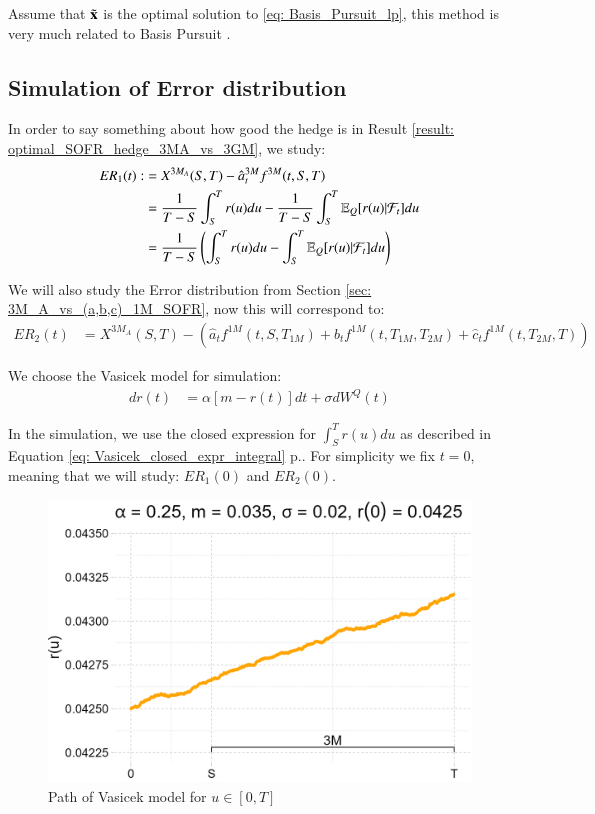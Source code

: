 Assume that $\Tilde{\mathbf{x}}$ is the optimal solution to \ref{eq: Basis_Pursuit_lp}, this method is
very much related to Basis Pursuit \cite{chen1998atomic}.



\newpage 

\subsection{Simulation of Error distribution}

In order to say something about how good the hedge is in Result \ref{result: optimal_SOFR_hedge_3MA_vs_3GM}, we study: 
\begin{align*}
ER_{1}(t) :&= X^{3M_{A}}(S,T) - \hat{a}_{t}^{3M}f^{3M}(t,S,T) \\ 
&= \frac{1}{T-S}\int_{S}^{T}r(u)du - \frac{1}{T-S}\int_{S}^{T}\mathbb{E}_{Q}[r(u)|\mathcal{F}_{t}]du \\ 
&= 
\frac{1}{T-S}\left(
\int_{S}^{T}r(u)du - \int_{S}^{T}\mathbb{E}_{Q}[r(u)|\mathcal{F}_{t}]du
\right)
\end{align*}

We will also study the Error distribution from Section \ref{sec: 3M_A_vs_(a,b,c)_1M_SOFR}, now this will correspond to: 
\begin{align*}
ER_{2}(t) &= 
X^{3M_{A}}(S,T) - \left(
\hat{a}_{t}f^{1M}(t,S,T_{1M}) + 
\hat{b}_{t}f^{1M}(t,T_{1M}, T_{2M}) + 
\hat{c}_{t}f^{1M}(t,T_{2M}, T)
\right)
\end{align*}


We choose the Vasicek model for simulation:
\begin{align*}
dr(t) &= \alpha[m-r(t)]dt + \sigma dW^{Q}(t)    
\end{align*}

In the simulation, we use the closed expression for $\int_{S}^{T}r(u)du$  as described in Equation \ref{eq: Vasicek_closed_expr_integral} p.\pageref{eq: Vasicek_closed_expr_integral}.
For simplicity we fix $t=0$, meaning that we will study: 
$ER_{1}(0)$ and $ER_{2}(0)$.

\begin{figure}[htp]
    \centering
    \includegraphics[width=12cm]{figures/SOFR/Vasicek_path.png}
    \caption{Path of Vasicek model for $u\in [0,T]$}
    \label{fig: Vasicek_path}
\end{figure}

